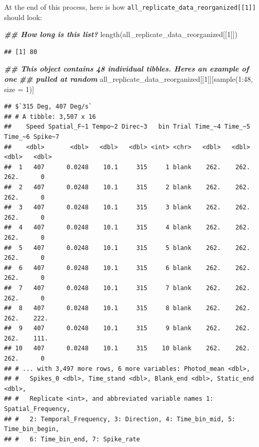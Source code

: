 \documentclass[
]{book}
\newenvironment{Shaded}{\begin{snugshade}}{\end{snugshade}}
\newcommand{\AttributeTok}[1]{\textcolor[rgb]{0.77,0.63,0.00}{#1}}
\newcommand{\DecValTok}[1]{\textcolor[rgb]{0.00,0.00,0.81}{#1}}
\newcommand{\DocumentationTok}[1]{\textcolor[rgb]{0.56,0.35,0.01}{\textbf{\textit{#1}}}}
\newcommand{\FunctionTok}[1]{\textcolor[rgb]{0.00,0.00,0.00}{#1}}
\newcommand{\NormalTok}[1]{#1}
\newcommand{\SpecialCharTok}[1]{\textcolor[rgb]{0.00,0.00,0.00}{#1}}
\begin{document}
At the end of this process, here is how \texttt{all\_replicate\_data\_reorganized{[}{[}1{]}{]}}
should look:

\begin{Shaded}
\begin{Highlighting}[]
\DocumentationTok{\#\# How long is this list?}
\FunctionTok{length}\NormalTok{(all\_replicate\_data\_reorganized[[}\DecValTok{1}\NormalTok{]])}
\end{Highlighting}
\end{Shaded}

\begin{verbatim}
## [1] 80
\end{verbatim}

\begin{Shaded}
\begin{Highlighting}[]
\DocumentationTok{\#\# This object contains 48 individual tibbles. Here\textquotesingle{}s an example of one}
\DocumentationTok{\#\# pulled at random}
\NormalTok{all\_replicate\_data\_reorganized[[}\DecValTok{1}\NormalTok{]][}\FunctionTok{sample}\NormalTok{(}\DecValTok{1}\SpecialCharTok{:}\DecValTok{48}\NormalTok{, }\AttributeTok{size =} \DecValTok{1}\NormalTok{)]}
\end{Highlighting}
\end{Shaded}

\begin{verbatim}
## $`315 Deg, 407 Deg/s`
## # A tibble: 3,507 x 16
##    Speed Spatial_F~1 Tempo~2 Direc~3   bin Trial Time_~4 Time_~5 Time_~6 Spike~7
##    <dbl>       <dbl>   <dbl>   <dbl> <int> <chr>   <dbl>   <dbl>   <dbl>   <dbl>
##  1   407      0.0248    10.1     315     1 blank    262.    262.    262.      0 
##  2   407      0.0248    10.1     315     2 blank    262.    262.    262.      0 
##  3   407      0.0248    10.1     315     3 blank    262.    262.    262.      0 
##  4   407      0.0248    10.1     315     4 blank    262.    262.    262.      0 
##  5   407      0.0248    10.1     315     5 blank    262.    262.    262.      0 
##  6   407      0.0248    10.1     315     6 blank    262.    262.    262.      0 
##  7   407      0.0248    10.1     315     7 blank    262.    262.    262.      0 
##  8   407      0.0248    10.1     315     8 blank    262.    262.    262.    222.
##  9   407      0.0248    10.1     315     9 blank    262.    262.    262.    111.
## 10   407      0.0248    10.1     315    10 blank    262.    262.    262.      0 
## # ... with 3,497 more rows, 6 more variables: Photod_mean <dbl>,
## #   Spikes_0 <dbl>, Time_stand <dbl>, Blank_end <dbl>, Static_end <dbl>,
## #   Replicate <int>, and abbreviated variable names 1: Spatial_Frequency,
## #   2: Temporal_Frequency, 3: Direction, 4: Time_bin_mid, 5: Time_bin_begin,
## #   6: Time_bin_end, 7: Spike_rate
\end{verbatim}
\end{document}
